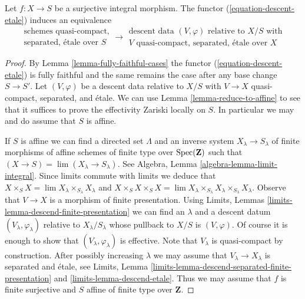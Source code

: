 \begin{proposition}
\label{proposition-effective}
Let $f : X \to S$ be a surjective integral morphism.
The functor (\ref{equation-descent-etale}) induces an equivalence
$$
\begin{matrix}
\text{schemes quasi-compact,}\\
\text{separated, \'etale over }S
\end{matrix}
\longrightarrow
\begin{matrix}
\text{descent data }(V, \varphi)\text{ relative to }X/S\text{ with}\\
V\text{ quasi-compact, separated, \'etale over }X
\end{matrix}
$$
\end{proposition}

\begin{proof}
By Lemma \ref{lemma-fully-faithful-cases} the
functor (\ref{equation-descent-etale})
is fully faithful and the same remains the case after any
base change $S \to S'$. Let $(V, \varphi)$ be a descent data
relative to $X/S$ with $V \to X$ quasi-compact, separated, and \'etale.
We can use Lemma \ref{lemma-reduce-to-affine}
to see that it suffices to prove the effectivity 
Zariski locally on $S$. In particular we may and do
assume that $S$ is affine.

\medskip\noindent
If $S$ is affine we can find a directed set $\Lambda$ and
an inverse system $X_\lambda \to S_\lambda$
of finite morphisms of affine schemes of finite type over
$\mathop{\mathrm{Spec}}(\mathbf{Z})$ such that $(X \to S) = \lim (X_\lambda \to S_\lambda)$.
See Algebra, Lemma \ref{algebra-lemma-limit-integral}.
Since limits commute with limits we deduce that
$X \times_S X = \lim X_\lambda \times_{S_\lambda} X_\lambda$
and 
$X \times_S X \times_S X = \lim
X_\lambda \times_{S_\lambda} X_\lambda \times_{S_\lambda} X_\lambda$.
Observe that $V \to X$ is a morphism of finite presentation.
Using Limits, Lemmas \ref{limits-lemma-descend-finite-presentation}
we can find an $\lambda$ and a descent datum $(V_\lambda, \varphi_\lambda)$
relative to $X_\lambda/S_\lambda$ whose pullback to $X/S$ is
$(V, \varphi)$. Of course it is enough to show that
$(V_\lambda, \varphi_\lambda)$ is effective. Note that $V_\lambda$
is quasi-compact by construction.
After possibly increasing $\lambda$ we may assume
that $V_\lambda \to X_\lambda$ is separated and \'etale, see
Limits, Lemma \ref{limits-lemma-descend-separated-finite-presentation} and
\ref{limits-lemma-descend-etale}.
Thus we may assume that $f$ is finite surjective and
$S$ affine of finite type over $\mathbf{Z}$.


\end{proof}
